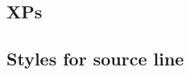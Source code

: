 \documentclass[output=book
  ,nonflat
  ,modfonts,
  ,colorlinks
  ,undecapitalize
  ,collection
  ,showindex
  ,draftmode
  ,openreview
  ,nobabel
  ,booklanguage=french
  ,oldstylenumbers
  ]{langsci/langscibook}
\begin{document}
\subsection{XPs}




\subsection{Styles for source line}




% 
%
% 
%
% 
%
% 
% 
% 
%
%
% 
%
% 
%
% 
%
%
\end{document}

